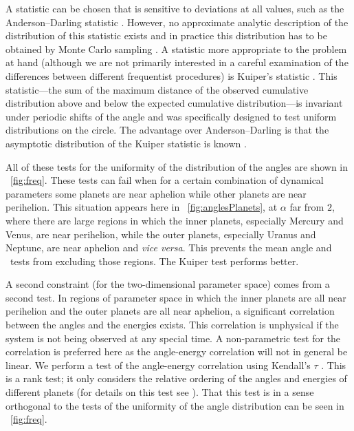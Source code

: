 A statistic can be chosen that is
sensitive to deviations at all values, such as the Anderson--Darling
statistic \citep{AndersonDarling}. However, no approximate analytic
description of the distribution of this statistic exists and in
practice this distribution has to be obtained by Monte Carlo sampling
\citep[\eg, ][]{roulette}. A statistic
more appropriate to the problem at hand (although we
are not primarily interested in a careful examination of the differences
between different frequentist procedures) is Kuiper's
statistic \citep{Kuiper62a}. This statistic---the sum of
the maximum distance of the observed cumulative distribution above and
below the expected cumulative distribution---is invariant under
periodic shifts of the angle and was specifically designed to test
uniform distributions on the circle. The advantage over
Anderson--Darling is that the asymptotic distribution of the
Kuiper statistic is known \citep[\eg, ][]{Press07a}.

All of these tests for the uniformity of the distribution of the angles
are shown in \figurename~\ref{fig:freq}. These tests can fail when for
a certain combination of dynamical parameters some planets are near
aphelion while other planets are near perihelion. This situation
appears here in \figurename~\ref{fig:anglesPlanets},
at $\alpha$ far from $2$, where there are
large regions in which the inner planets, especially Mercury and
Venus, are near perihelion, while the outer planets, especially Uranus
and Neptune, are near aphelion and \textit{vice versa}.  This prevents
the mean angle and \KS\ tests from excluding those regions. The Kuiper
test performs better.

A second constraint (for the two-dimensional parameter space) comes
from a second test. In regions of parameter space in which
the inner planets are all near perihelion and the outer planets are
all near aphelion, a significant correlation between the angles and
the energies exists. This correlation is unphysical if the system is
not being observed at any special time.
A non-parametric test for the correlation is preferred
here as the angle-energy correlation will not in general be linear. We
perform a test of the angle-energy correlation using Kendall's $\tau$
\citep{Kendall38a}.  This is a rank test; it only considers the
relative ordering of the angles and energies of different planets (for
details on this test see \citealt{Press07a}). That this test is in a
sense orthogonal to the tests of the uniformity of the angle
distribution can be seen in \figurename~\ref{fig:freq}.

